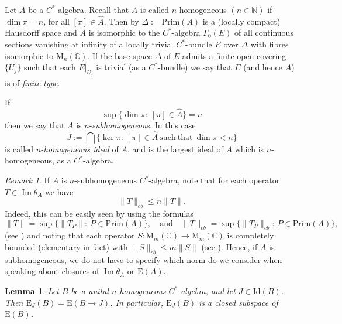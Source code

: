 \documentclass[]{amsart}
\newtheorem{lemma}[theorem]{Lemma}
\theoremstyle{remark}
\newtheorem{remark}[theorem]{Remark}
\theoremstyle{definition}
\theoremstyle{question}
\numberwithin{equation}{section}
\begin{document}
Let $A$ be a $C^*$-algebra. Recall that $A$ is called $n$-homogeneous $(n \in
{\mathbb{N}})$ if $\dim \pi =n$, for all $[\pi] \in \hat{A}$. Then by \cite[3.2]{Fell}
$\Delta:=\mathrm{Prim}(A)$ is a (locally compact) Hausdorff space and $A$ is
isomorphic to the $C^*$-algebra $\Gamma_0(E)$ of all continuous sections
vanishing at infinity of a locally trivial $C^*$-bundle $E$ over $\Delta$ with
fibres isomorphic to ${\mathrm{M}}_n({\mathbb{C}})$. If the base space $\Delta$ of $E$
admits a finite open covering
$\{U_j\}$ such that each $E|_{U_j}$ is trivial (as a $C^*$-bundle) we say that
$E$ (and hence $A$) is of \textit{finite type}.

If $$\sup\{\dim \pi : \ [\pi] \in \hat{A}\}=n$$
then we say that $A$ is $n$-\textit{subhomogeneous}. In this case $$J:=\bigcap
\{\ker \pi : \ [\pi] \in \hat{A} \ \mathrm{such} \ \mathrm{that} \  \dim \pi < n
\}$$
is called $n$-\textit{homogeneous ideal} of $A$, and is the largest ideal of $A$
which is $n$-homogeneous, as a $C^*$-algebra.
\begin{remark} If $A$ is $n$-subhomogeneous $C^*$-algebra, note that for each operator $T \in {\mathop{\mathrm{Im}}} \theta_A$ we have $$\|T\|_{cb} \leq n \|T\|.$$
Indeed, this can be easily seen by using the formulas
 \begin{equation}\label{opformula}
\|T\|=\sup\{\|T_P\| : \ P \in \mathrm{Prim}(A)\}, \quad \mathrm{and} \quad
\|T\|_{cb}=\sup\{\|T_P\|_{cb} : \ P \in \mathrm{Prim}(A)\},
\end{equation}
(see \cite[5.3.12]{Ara}) and noting that each operator $S : {\mathrm{M}}_m({\mathbb{C}}) \to {\mathrm{M}}_m({\mathbb{C}})$ is completely bounded (elementary in fact) with
$\|S\|_{cb} \leq m\|S\|$ (see \cite[Exercise\,3.11]{Paul}). Hence, if $A$ is subhomogeneous, we do not have to specify which norm do we
consider when speaking about closures of ${\mathop{\mathrm{Im}}} \theta_A$ or ${\mathrm{E}}(A)$.
\end{remark}

\begin{lemma}\label{E(B;J)} Let $B$ be a unital $n$-homogeneous $C^*$-algebra,
and let $J \in \mathrm{Id}(B)$. Then
${\mathrm{E}}_J(B)={\mathrm{E}}(B\rightarrow J)$. In particular, ${\mathrm{E}}_J(B)$ is a closed subspace of ${\mathrm{E}}(B)$.

\end{lemma}
\end{document}
